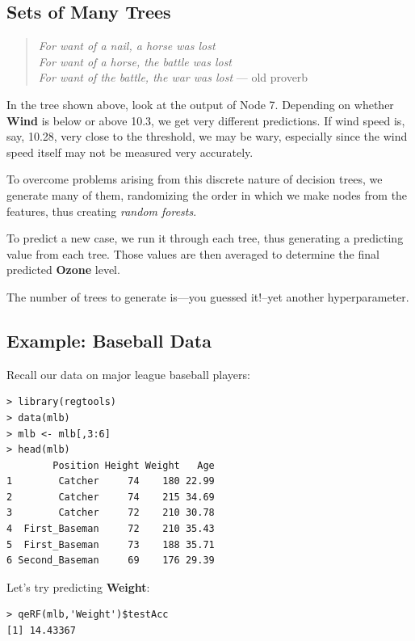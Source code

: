 \subsection{Sets of Many Trees}

\noindent
\begin{quote}
{\it
For want of a nail, a horse was lost \\
For want of a horse, the battle was lost \\
For want of the battle, the war was lost
} --- old proverb
\end{quote}

In the tree shown above, look at the output of Node 7.  Depending on
whether \textbf{Wind} is below or above 10.3, we get very different
predictions.  If wind speed is, say, 10.28, very close to the threshold,
we may be wary, especially since the wind speed itself may not be
measured very accurately.

To overcome problems arising from this discrete nature of decision
trees, we generate many of them, randomizing the order in which we make
nodes from the features, thus creating \textit{random forests}.

To predict a new case, we run it through each tree, thus generating a
predicting value from each tree.  Those values are then averaged to
determine the final predicted \textbf{Ozone} level.

The number of trees to generate is---you guessed it!--yet another
hyperparameter.

\subsection{Example:  Baseball Data}

Recall our data on major league baseball players:

\begin{lstlisting}
> library(regtools)
> data(mlb)
> mlb <- mlb[,3:6]
> head(mlb)
        Position Height Weight   Age
1        Catcher     74    180 22.99
2        Catcher     74    215 34.69
3        Catcher     72    210 30.78
4  First_Baseman     72    210 35.43
5  First_Baseman     73    188 35.71
6 Second_Baseman     69    176 29.39
\end{lstlisting}

Let's try predicting \textbf{Weight}:

\begin{lstlisting} 
> qeRF(mlb,'Weight')$testAcc
[1] 14.43367
\end{lstlisting}


